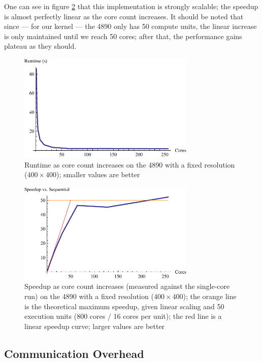 \documentclass{acmsiggraph}
\begin{document}
One can see in figure \ref{fig:strongPlotTwo} that this implementation is strongly scalable; the speedup is almost perfectly linear as the core count increases. It should be noted that since --- for our kernel --- the 4890 only has 50 compute units, the linear increase is only maintained until we reach 50 cores; after that, the performance gains plateau as they should.

\begin{figure}
    \includegraphics[width=84.5mm]{strongPlotOne.pdf}
    \caption{Runtime as core count increases on the 4890 with a fixed resolution ($400\times400$); smaller values are better}
    \label{fig:strongPlotOne}
\end{figure}

\begin{figure}
    \includegraphics[width=84.5mm]{strongPlotTwo.pdf}
    \caption{Speedup as core count increases (measured against the single-core run) on the 4890 with a fixed resolution ($400\times400$); the orange line is the theoretical maximum speedup, given linear scaling and 50 execution units (800 cores / 16 cores per unit); the red line is a linear speedup curve; larger values are better}
    \label{fig:strongPlotTwo}
\end{figure}

\subsection{Communication Overhead}
\end{document}

